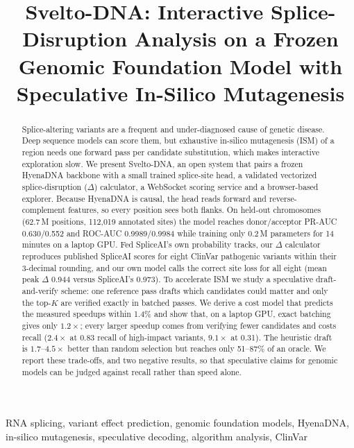 \documentclass[conference]{IEEEtran}
\begin{document}
\title{Svelto-DNA: Interactive Splice-Disruption Analysis on a Frozen Genomic Foundation Model with Speculative In-Silico Mutagenesis}

\author{
\and
{}}

\maketitle

\begin{abstract}
Splice-altering variants are a frequent and under-diagnosed cause of genetic disease. Deep sequence models can score them, but exhaustive in-silico mutagenesis (ISM) of a region needs one forward pass per candidate substitution, which makes interactive exploration slow. We present Svelto-DNA, an open system that pairs a frozen HyenaDNA backbone with a small trained splice-site head, a validated vectorized splice-disruption ($\Delta$) calculator, a WebSocket scoring service and a browser-based explorer. Because HyenaDNA is causal, the head reads forward and reverse-complement features, so every position sees both flanks. On held-out chromosomes (62.7\,M positions, 112{,}019 annotated sites) the model reaches donor/acceptor PR-AUC 0.630/0.552 and ROC-AUC 0.9989/0.9984 while training only 0.2\,M parameters for 14 minutes on a laptop GPU. Fed SpliceAI's own probability tracks, our $\Delta$ calculator reproduces published SpliceAI scores for eight ClinVar pathogenic variants within their 3-decimal rounding, and our own model calls the correct site loss for all eight (mean peak $\Delta$ 0.944 versus SpliceAI's 0.973). To accelerate ISM we study a speculative draft-and-verify scheme: one reference pass drafts which candidates could matter and only the top-$K$ are verified exactly in batched passes. We derive a cost model that predicts the measured speedups within 1.4\% and show that, on a laptop GPU, exact batching gives only $1.2\times$; every larger speedup comes from verifying fewer candidates and costs recall ($2.4\times$ at 0.83 recall of high-impact variants, $9.1\times$ at 0.31). The heuristic draft is $1.7$--$4.5\times$ better than random selection but reaches only 51--87\% of an oracle. We report these trade-offs, and two negative results, so that speculative claims for genomic models can be judged against recall rather than speed alone.
\end{abstract}

\begin{IEEEkeywords}
RNA splicing, variant effect prediction, genomic foundation models, HyenaDNA, in-silico mutagenesis, speculative decoding, algorithm analysis, ClinVar
\end{IEEEkeywords}
\end{document}
